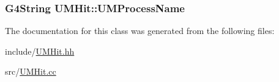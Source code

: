 \subsubsection[{U\+M\+Process\+Name}]{\setlength{\rightskip}{0pt plus 5cm}G4\+String U\+M\+Hit\+::\+U\+M\+Process\+Name\hspace{0.3cm}{\ttfamily [private]}}\label{classUMHit_ac4f5fd214eb213afa3560a18d9b6120b}


The documentation for this class was generated from the following files\+:\begin{DoxyCompactItemize}
\item 
include/\hyperlink{UMHit_8hh}{U\+M\+Hit.\+hh}\item 
src/\hyperlink{UMHit_8cc}{U\+M\+Hit.\+cc}\end{DoxyCompactItemize}
